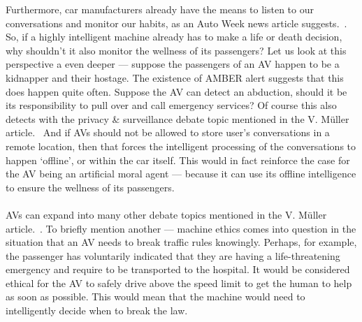 \documentclass[12pt]{article}
\newcommand{\supercite}[1]{~{\textsuperscript{\cite{#1}}}}
\begin{document}
Furthermore, car manufacturers already have the means to listen to our
conversations and monitor our habits, as an Auto Week news
article suggests.\supercite{auto-week-article}. So, if a highly intelligent 
machine already has to make a life or death decision, why shouldn't it 
also monitor the wellness of its passengers?
Let us look at this perspective a even deeper --- suppose the passengers of 
an AV happen to be a kidnapper and their hostage. The existence of AMBER
alert suggests that this does happen quite often. Suppose the AV can detect
an abduction, should it be its responsibility to pull over and call emergency
services? Of course this also detects with the privacy \& surveillance debate
topic mentioned in the V. Müller article.\supercite{sep-ethics-ai} And if
AVs should not be allowed to store user's conversations in a remote location,
then that forces the intelligent processing of the conversations to happen
`offline', or within the car itself. This would in fact reinforce the case
for the AV being an artificial moral agent --- because it can use its offline
intelligence to ensure the wellness of its passengers.\\
\vspace{0in}\\
AVs can expand into many other debate topics mentioned in the V. Müller 
article.\supercite{sep-ethics-ai}. To briefly mention another --- machine
ethics comes into question in the situation that an AV needs to break
traffic rules knowingly. Perhaps, for example, the passenger has
voluntarily indicated
that they are having a life-threatening emergency and require to
be transported to the hospital. It would be considered ethical for the
AV to safely drive above the speed limit to get the human to help
as soon as possible. This would mean that the machine would need
to intelligently decide when to break the law.\\
\vspace{0in}\\
\pagebreak



\end{document}
